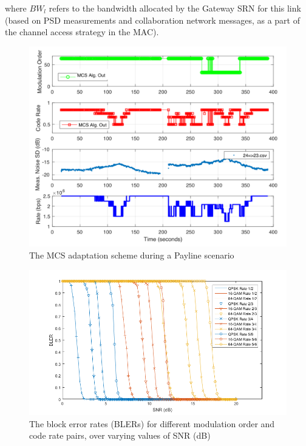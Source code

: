 where $BW_{l}$ refers to the bandwidth allocated by the Gateway SRN for this link (based on PSD measurements and collaboration network messages, as a part of the channel access strategy in the MAC).
\begin{figure} [htb]
    \centerline{
    \includegraphics[width = 1.0\textwidth]{Payline_MCS_Adaptation.PNG}}
    \caption{The MCS adaptation scheme during a Payline scenario}
    \label{fig:B.3}
\end{figure}
\begin{figure} [htb]
    \centerline{
    \includegraphics[width = 1.0\textwidth]{BLER.PNG}}
    \caption{The block error rates (BLERs) for different modulation order and code rate pairs, over varying values of SNR (dB)}
    \label{fig:B.4}
\end{figure}

